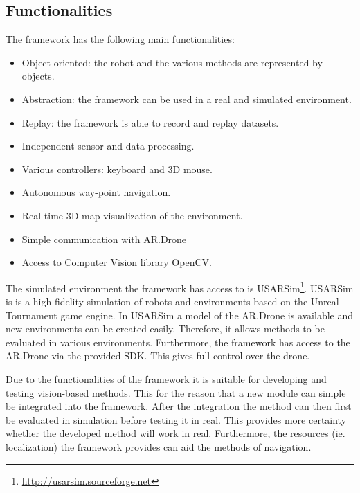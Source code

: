 \documentclass[a4paper]{article}
\begin{document}
\subsection{Functionalities}
The framework has the following main functionalities:
\begin{itemize}
\item Object-oriented: the robot and the various methods are represented by objects.
\item Abstraction: the framework can be used in a real and simulated environment.
\item Replay: the framework is able to record and replay datasets.
\item Independent sensor and data processing.
\item Various controllers: keyboard and 3D mouse.
\item Autonomous way-point navigation.
\item Real-time 3D map visualization of the environment.
\item Simple communication with AR.Drone
\item Access to Computer Vision library OpenCV.
\end{itemize}
The simulated environment the framework has access to is  USARSim\footnote{\url{http://usarsim.sourceforge.net}}. USARSim is is a high-fidelity simulation of robots and environments based on the Unreal Tournament game engine. In USARSim a model of the AR.Drone is available and new environments can be created easily. Therefore, it allows methods to be evaluated in various environments. Furthermore, the framework has access to the AR.Drone via the provided SDK. This gives full control over the drone.

Due to the functionalities of the framework it is suitable for developing and testing vision-based methods. This for the reason that a new module can simple be integrated into the framework. After the integration the method can then first be evaluated in simulation before testing it in real. This provides more certainty whether the developed method will work in real. Furthermore, the resources (ie. localization) the framework provides can aid the methods of navigation.
\end{document}
